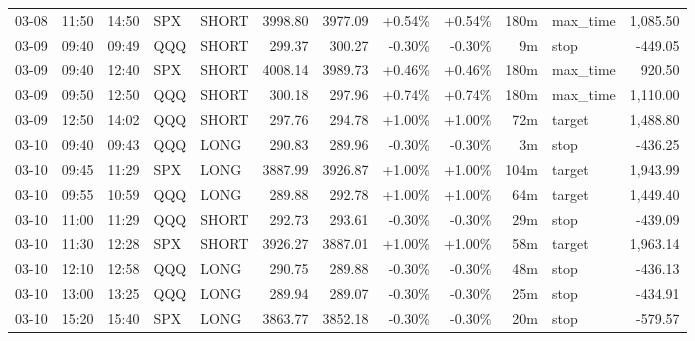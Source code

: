 \documentclass[11pt,a4paper,twoside]{article}
\begin{document}
\begin{center}
\begin{longtable}{>{\color{txtmain}}l l l l l r r r r r >{\color{txtmain}}l r}
03-08 & 11:50 & 14:50 & SPX & SHORT & 3998.80 & 3977.09 & \textcolor{wingreen}{+0.54\%} & \textcolor{wingreen}{+0.54\%} & 180m & max\_time & \textcolor{wingreen}{1,085.50} \\
03-09 & 09:40 & 09:49 & QQQ & SHORT & 299.37 & 300.27 & \textcolor{lossred}{-0.30\%} & \textcolor{lossred}{-0.30\%} & 9m & stop & \textcolor{lossred}{-449.05} \\
03-09 & 09:40 & 12:40 & SPX & SHORT & 4008.14 & 3989.73 & \textcolor{wingreen}{+0.46\%} & \textcolor{wingreen}{+0.46\%} & 180m & max\_time & \textcolor{wingreen}{920.50} \\
03-09 & 09:50 & 12:50 & QQQ & SHORT & 300.18 & 297.96 & \textcolor{wingreen}{+0.74\%} & \textcolor{wingreen}{+0.74\%} & 180m & max\_time & \textcolor{wingreen}{1,110.00} \\
03-09 & 12:50 & 14:02 & QQQ & SHORT & 297.76 & 294.78 & \textcolor{wingreen}{+1.00\%} & \textcolor{wingreen}{+1.00\%} & 72m & target & \textcolor{wingreen}{1,488.80} \\
03-10 & 09:40 & 09:43 & QQQ & LONG & 290.83 & 289.96 & \textcolor{lossred}{-0.30\%} & \textcolor{lossred}{-0.30\%} & 3m & stop & \textcolor{lossred}{-436.25} \\
03-10 & 09:45 & 11:29 & SPX & LONG & 3887.99 & 3926.87 & \textcolor{wingreen}{+1.00\%} & \textcolor{wingreen}{+1.00\%} & 104m & target & \textcolor{wingreen}{1,943.99} \\
03-10 & 09:55 & 10:59 & QQQ & LONG & 289.88 & 292.78 & \textcolor{wingreen}{+1.00\%} & \textcolor{wingreen}{+1.00\%} & 64m & target & \textcolor{wingreen}{1,449.40} \\
03-10 & 11:00 & 11:29 & QQQ & SHORT & 292.73 & 293.61 & \textcolor{lossred}{-0.30\%} & \textcolor{lossred}{-0.30\%} & 29m & stop & \textcolor{lossred}{-439.09} \\
03-10 & 11:30 & 12:28 & SPX & SHORT & 3926.27 & 3887.01 & \textcolor{wingreen}{+1.00\%} & \textcolor{wingreen}{+1.00\%} & 58m & target & \textcolor{wingreen}{1,963.14} \\
03-10 & 12:10 & 12:58 & QQQ & LONG & 290.75 & 289.88 & \textcolor{lossred}{-0.30\%} & \textcolor{lossred}{-0.30\%} & 48m & stop & \textcolor{lossred}{-436.13} \\
03-10 & 13:00 & 13:25 & QQQ & LONG & 289.94 & 289.07 & \textcolor{lossred}{-0.30\%} & \textcolor{lossred}{-0.30\%} & 25m & stop & \textcolor{lossred}{-434.91} \\
03-10 & 15:20 & 15:40 & SPX & LONG & 3863.77 & 3852.18 & \textcolor{lossred}{-0.30\%} & \textcolor{lossred}{-0.30\%} & 20m & stop & \textcolor{lossred}{-579.57} \\

\end{longtable}
\end{center}
\end{document}
